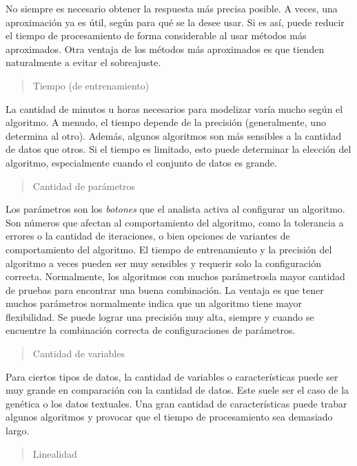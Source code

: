 \documentclass[]{book}
\begin{document}
No siempre es necesario obtener la respuesta más precisa posible. A veces, una aproximación ya es útil, según para qué se la desee usar. Si es así, puede reducir el tiempo de procesamiento de forma considerable al usar métodos más aproximados. Otra ventaja de los métodos más aproximados es que tienden naturalmente a evitar el sobreajuste.

\begin{quote}
Tiempo (de entrenamiento)
\end{quote}

La cantidad de minutos u horas necesarios para modelizar varía mucho según el algoritmo. A menudo, el tiempo depende de la precisión (generalmente, uno determina al otro). Además, algunos algoritmos son más sensibles a la cantidad de datos que otros. Si el tiempo es limitado, esto puede determinar la elección del algoritmo, especialmente cuando el conjunto de datos es grande.

\begin{quote}
Cantidad de parámetros
\end{quote}

Los parámetros son los \emph{botones} que el analista activa al configurar un algoritmo. Son números que afectan al comportamiento del algoritmo, como la tolerancia a errores o la cantidad de iteraciones, o bien opciones de variantes de comportamiento del algoritmo. El tiempo de entrenamiento y la precisión del algoritmo a veces pueden ser muy sensibles y requerir solo la configuración correcta. Normalmente, los algoritmos con muchos parámetrosla mayor cantidad de pruebas para encontrar una buena combinación. La ventaja es que tener muchos parámetros normalmente indica que un algoritmo tiene mayor flexibilidad. Se puede lograr una precisión muy alta, siempre y cuando se encuentre la combinación correcta de configuraciones de parámetros.

\begin{quote}
Cantidad de variables
\end{quote}

Para ciertos tipos de datos, la cantidad de variables o características puede ser muy grande en comparación con la cantidad de datos. Este suele ser el caso de la genética o los datos textuales. Una gran cantidad de características puede trabar algunos algoritmos y provocar que el tiempo de procesamiento sea demasiado largo.

\begin{quote}
Linealidad
\end{quote}
\end{document}
